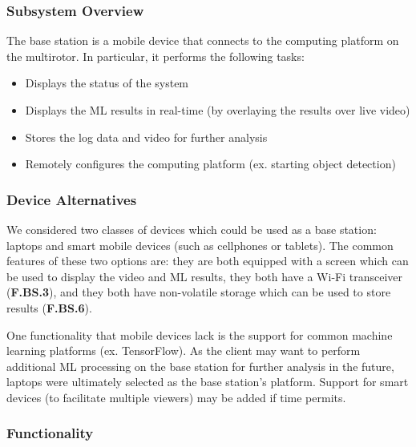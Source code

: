 \subsubsection{Subsystem Overview}

The base station is a mobile device that connects to the computing platform on the multirotor. In particular, it performs the following tasks:
\begin{itemize}
    \item Displays the status of the system
    \item Displays the ML results in real-time (by overlaying the results over live video)
    \item Stores the log data and video for further analysis
    \item Remotely configures the computing platform (ex. starting object detection)
\end{itemize}

\subsubsection{Device Alternatives}
We considered two classes of devices which could be used as a base station: laptops and smart mobile devices (such as cellphones or tablets). The common features of these two options are: they are both equipped with a screen which can be used to display the video and ML results, they both have a Wi-Fi transceiver (\textbf{F.BS.3}), and they both have non-volatile storage which can be used to store results (\textbf{F.BS.6}).

One functionality that mobile devices lack is the support for common machine learning platforms (ex. TensorFlow). As the client may want to perform additional ML processing on the base station for further analysis in the future, laptops were ultimately selected as the base station's platform. Support for smart devices (to facilitate multiple viewers) may be added if time permits.

\subsubsection{Functionality}


